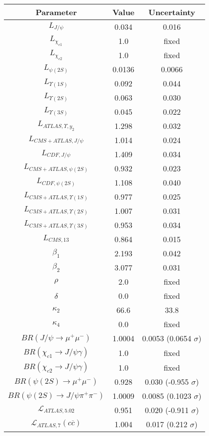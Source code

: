 \begin{table}[h!]
\centering
\begin{tabular}{c|c|c}
Parameter & Value & Uncertainty \\
\hline
$L_{J/\psi}$ & 0.034 & 0.016 \\
$L_{\chi_{c1}}$ & 1.0 & fixed \\
$L_{\chi_{c2}}$ & 1.0 & fixed \\
$L_{\psi(2S)}$ & 0.0136 & 0.0066 \\
$L_{\Upsilon(1S)}$ & 0.092 & 0.044 \\
$L_{\Upsilon(2S)}$ & 0.063 & 0.030 \\
$L_{\Upsilon(3S)}$ & 0.045 & 0.022 \\
$L_{ATLAS,\Upsilon,y_2}$ & 1.298 & 0.032 \\
$L_{CMS+ATLAS,J/\psi}$ & 1.014 & 0.024 \\
$L_{CDF,J/\psi}$ & 1.409 & 0.034 \\
$L_{CMS+ATLAS,\psi(2S)}$ & 0.932 & 0.023 \\
$L_{CDF,\psi(2S)}$ & 1.108 & 0.040 \\
$L_{CMS+ATLAS,\Upsilon(1S)}$ & 0.977 & 0.025 \\
$L_{CMS+ATLAS,\Upsilon(2S)}$ & 1.007 & 0.031 \\
$L_{CMS+ATLAS,\Upsilon(3S)}$ & 0.953 & 0.034 \\
$L_{CMS,13}$ & 0.864 & 0.015 \\
$\beta_1$ & 2.193 & 0.042 \\
$\beta_2$ & 3.077 & 0.031 \\
$\rho$ & 2.0 & fixed \\
$\delta$ & 0.0 & fixed \\
$\kappa_2$ & 66.6 & 33.8 \\
$\kappa_4$ & 0.0 & fixed \\
$BR(J/\psi\rightarrow\mu^+\mu^-)$ & 1.0004 & 0.0053 (0.0654 $\sigma$) \\
$BR(\chi_{c1}\rightarrow J/\psi\gamma)$ & 1.0 & fixed \\
$BR(\chi_{c2}\rightarrow J/\psi\gamma)$ & 1.0 & fixed \\
$BR(\psi(2S)\rightarrow\mu^+\mu^-)$ & 0.928 & 0.030 (-0.955 $\sigma$) \\
$BR(\psi(2S)\rightarrow J/\psi\pi^+\pi^-)$ & 1.0009 & 0.0085 (0.1023 $\sigma$) \\
$\mathcal L_{ATLAS,5.02}$ & 0.951 & 0.020 (-0.911 $\sigma$) \\
$\mathcal L_{ATLAS,7}(c\overline c)$ & 1.004 & 0.017 (0.212 $\sigma$) \\

\end{tabular}
\end{table}
